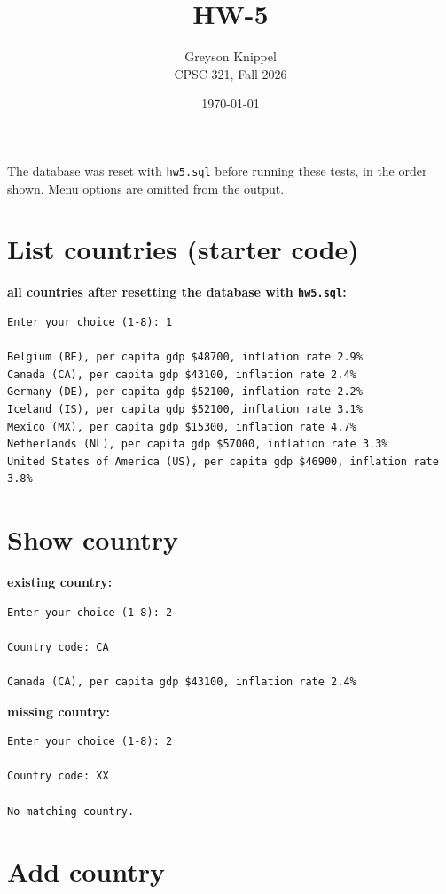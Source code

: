 \documentclass[11pt]{article}
\title{HW-5}
\author{
Greyson Knippel \\[4pt]
CPSC 321, Fall 2026\\[4pt]
}
\date{\today}
\begin{document}
\maketitle

The database was reset with \texttt{hw5.sql} before running these tests,
in the order shown. Menu options are omitted from the output.

\section*{List countries (starter code)}

\noindent \textbf{all countries after resetting the database with \texttt{hw5.sql}:}
{\small
\begin{verbatim}
Enter your choice (1-8): 1

Belgium (BE), per capita gdp $48700, inflation rate 2.9%
Canada (CA), per capita gdp $43100, inflation rate 2.4%
Germany (DE), per capita gdp $52100, inflation rate 2.2%
Iceland (IS), per capita gdp $52100, inflation rate 3.1%
Mexico (MX), per capita gdp $15300, inflation rate 4.7%
Netherlands (NL), per capita gdp $57000, inflation rate 3.3%
United States of America (US), per capita gdp $46900, inflation rate 3.8%
\end{verbatim}
}

\section*{Show country}

\noindent \textbf{existing country:}
{\small
\begin{verbatim}
Enter your choice (1-8): 2

Country code: CA

Canada (CA), per capita gdp $43100, inflation rate 2.4%
\end{verbatim}
}

\noindent \textbf{missing country:}
{\small
\begin{verbatim}
Enter your choice (1-8): 2

Country code: XX

No matching country.
\end{verbatim}
}

\section*{Add country}
\end{document}
